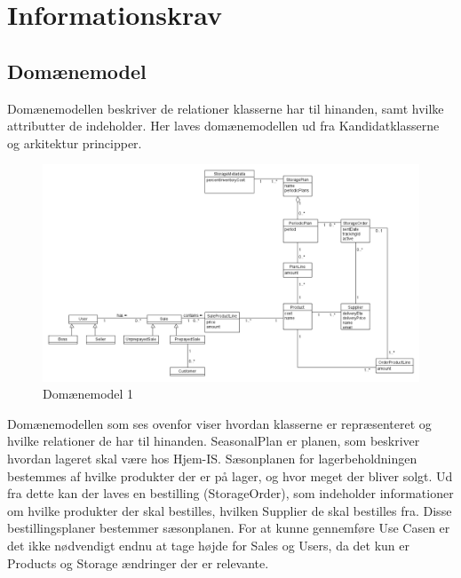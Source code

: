 \section{Informationskrav}\label{sec:informations-krav}

\subsection{Domænemodel}\label{Domainmodel}
Domænemodellen\cite{Larman2004} beskriver de relationer klasserne har til hinanden, samt hvilke attributter de indeholder. Her laves domænemodellen ud fra Kandidatklasserne og arkitektur principper.

\begin{landscape}
\begin{figure}[p]
    \centering
    \includegraphics[width=0.9\hsize]{figures/krav/domain_model_1.png}
    \caption{Domænemodel 1}
    \label{fig:domain_model}
\end{figure}
\end{landscape}

Domænemodellen som ses ovenfor viser hvordan klasserne er repræsenteret og hvilke relationer de har til hinanden. SeasonalPlan er planen, som beskriver hvordan lageret skal være hos Hjem-IS. Sæsonplanen for lagerbeholdningen bestemmes af hvilke produkter der er på lager, og hvor meget der bliver solgt. Ud fra dette kan der laves en bestilling (StorageOrder), som indeholder informationer om hvilke produkter der skal bestilles, hvilken Supplier de skal bestilles fra. Disse bestillingsplaner bestemmer sæsonplanen.
For at kunne gennemføre Use Casen er det ikke nødvendigt endnu at tage højde for Sales og Users, da det kun er Products og Storage ændringer der er relevante. 

